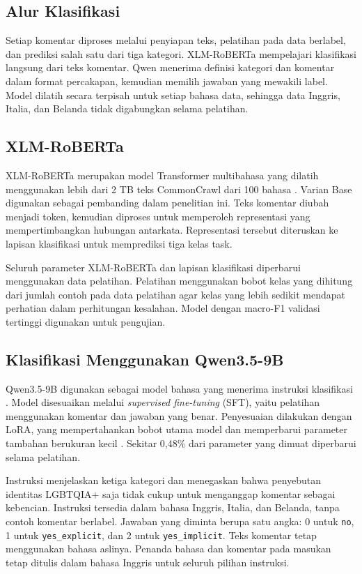 \documentclass[11pt]{article}
\begin{document}
\subsection{Alur Klasifikasi}
Setiap komentar diproses melalui penyiapan teks, pelatihan pada data berlabel, dan prediksi salah satu dari tiga kategori. XLM-RoBERTa mempelajari klasifikasi langsung dari teks komentar. Qwen menerima definisi kategori dan komentar dalam format percakapan, kemudian memilih jawaban yang mewakili label. Model dilatih secara terpisah untuk setiap bahasa data, sehingga data Inggris, Italia, dan Belanda tidak digabungkan selama pelatihan.

\subsection{XLM-RoBERTa}
XLM-RoBERTa merupakan model Transformer multibahasa yang dilatih menggunakan lebih dari 2 TB teks CommonCrawl dari 100 bahasa \citep{conneau-etal-2020-unsupervised}. Varian Base digunakan sebagai pembanding dalam penelitian ini. Teks komentar diubah menjadi token, kemudian diproses untuk memperoleh representasi yang mempertimbangkan hubungan antarkata. Representasi tersebut diteruskan ke lapisan klasifikasi untuk memprediksi tiga kelas task.

Seluruh parameter XLM-RoBERTa dan lapisan klasifikasi diperbarui menggunakan data pelatihan. Pelatihan menggunakan bobot kelas yang dihitung dari jumlah contoh pada data pelatihan agar kelas yang lebih sedikit mendapat perhatian dalam perhitungan kesalahan. Model dengan macro-F1 validasi tertinggi digunakan untuk pengujian.

\subsection{Klasifikasi Menggunakan Qwen3.5-9B}
Qwen3.5-9B digunakan sebagai model bahasa yang menerima instruksi klasifikasi \citep{qwen-team-2026-qwen35}. Model disesuaikan melalui \textit{supervised fine-tuning} (SFT), yaitu pelatihan menggunakan komentar dan jawaban yang benar. Penyesuaian dilakukan dengan LoRA, yang mempertahankan bobot utama model dan memperbarui parameter tambahan berukuran kecil \citep{hu-etal-2021-lora}. Sekitar 0,48\% dari parameter yang dimuat diperbarui selama pelatihan.

Instruksi menjelaskan ketiga kategori dan menegaskan bahwa penyebutan identitas LGBTQIA+ saja tidak cukup untuk menganggap komentar sebagai kebencian. Instruksi tersedia dalam bahasa Inggris, Italia, dan Belanda, tanpa contoh komentar berlabel. Jawaban yang diminta berupa satu angka: 0 untuk \texttt{no}, 1 untuk \texttt{yes\_explicit}, dan 2 untuk \texttt{yes\_implicit}. Teks komentar tetap menggunakan bahasa aslinya. Penanda bahasa dan komentar pada masukan tetap ditulis dalam bahasa Inggris untuk seluruh pilihan instruksi.
\end{document}
